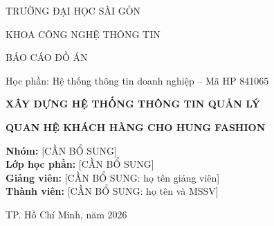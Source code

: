 \begin{titlepage}
\centering
{\large TRƯỜNG ĐẠI HỌC SÀI GÒN\par}
{\large KHOA CÔNG NGHỆ THÔNG TIN\par}
\vspace{2.5cm}
{\Large BÁO CÁO ĐỒ ÁN\par}
\vspace{0.4cm}
{\large Học phần: Hệ thống thông tin doanh nghiệp -- Mã HP 841065\par}
\vspace{1.8cm}
{\huge\bfseries XÂY DỰNG HỆ THỐNG THÔNG TIN QUẢN LÝ\par}
\vspace{0.2cm}
{\huge\bfseries QUAN HỆ KHÁCH HÀNG CHO HUNG FASHION\par}
\vfill
\begin{flushleft}
\textbf{Nhóm:} [CẦN BỔ SUNG]\\[0.3cm]
\textbf{Lớp học phần:} [CẦN BỔ SUNG]\\[0.3cm]
\textbf{Giảng viên:} [CẦN BỔ SUNG: họ tên giảng viên]\\[0.3cm]
\textbf{Thành viên:} [CẦN BỔ SUNG: họ tên và MSSV]
\end{flushleft}
\vfill
{TP. Hồ Chí Minh, năm 2026\par}
\end{titlepage}

